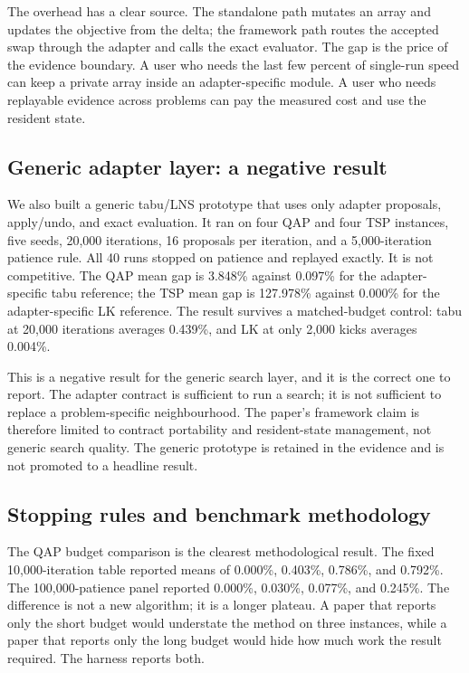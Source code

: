\documentclass[pdflatex,sn-mathphys-num]{sn-jnl}
\begin{document}
The overhead has a clear source. The standalone path mutates an array and updates the objective from
the delta; the framework path routes the accepted swap through the adapter and calls the exact
evaluator. The gap is the price of the evidence boundary. A user who needs the last few percent of
single-run speed can keep a private array inside an adapter-specific module. A user who needs
replayable evidence across problems can pay the measured cost and use the resident state.

\subsection{Generic adapter layer: a negative result}

We also built a generic tabu/LNS prototype that uses only adapter proposals, apply/undo, and exact
evaluation. It ran on four QAP and four TSP instances, five seeds, 20,000 iterations, 16 proposals per
iteration, and a 5,000-iteration patience rule. All 40 runs stopped on patience and replayed exactly.
It is not competitive. The QAP mean gap is 3.848\% against 0.097\% for the adapter-specific tabu
reference; the TSP mean gap is 127.978\% against 0.000\% for the adapter-specific LK reference. The
result survives a matched-budget control: tabu at 20,000 iterations averages 0.439\%, and LK at only
2,000 kicks averages 0.004\%.

This is a negative result for the generic search layer, and it is the correct one to report. The
adapter contract is sufficient to run a search; it is not sufficient to replace a problem-specific
neighbourhood. The paper's framework claim is therefore limited to contract portability and
resident-state management, not generic search quality. The generic prototype is retained in the
evidence and is not promoted to a headline result.

\subsection{Stopping rules and benchmark methodology}

The QAP budget comparison is the clearest methodological result. The fixed 10,000-iteration table
reported means of 0.000\%, 0.403\%, 0.786\%, and 0.792\%. The 100,000-patience panel reported 0.000\%,
0.030\%, 0.077\%, and 0.245\%. The difference is not a new algorithm; it is a longer plateau. A paper
that reports only the short budget would understate the method on three instances, while a paper that
reports only the long budget would hide how much work the result required. The harness reports both.
\end{document}
